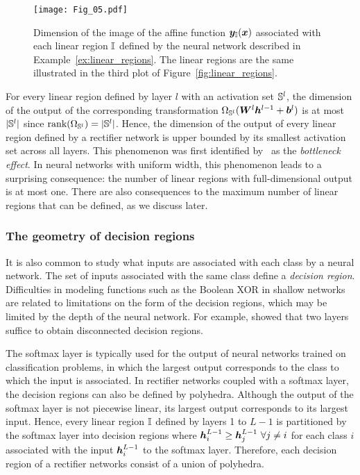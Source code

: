 \begin{figure}
    \centering
    \texttt{[image: Fig\_05.pdf]}
    \caption{Dimension of the image of the affine function ${\bm{y}}_{{\mathbb{I}}}({\bm{x}})$ associated with each linear region ${\mathbb{I}}$ defined by the neural network described in Example~\ref{ex:linear_regions}. The linear regions are the same illustrated in the third plot of Figure~\ref{fig:linear_regions}.}
    \label{fig:dimensions}
\end{figure}


For every linear region defined by layer $l$ with an activation set ${\mathbb{S}}^l$, the dimension of the output of the corresponding transformation $\Omega_{{\mathbb{S}}^l}({\bm{W}}^l {\bm{h}}^{l-1} + {\bm{b}}^l)$ is at most $|{\mathbb{S}}^l|$ since $\text{rank}(\Omega_{{\mathbb{S}}^l}) = |{\mathbb{S}}^l|$. Hence, the dimension of the output of every linear region defined by a rectifier network is upper bounded by its smallest activation set across all layers. This phenomenon was first identified by~\cite{serra2018bounding} as the \emph{bottleneck effect}. In neural networks with uniform width, this phenomenon leads to a surprising consequence: the number of linear regions with full-dimensional output is at most one. There are also consequences to the maximum number of linear regions that can be defined, as we discuss later.
% 


\subsubsection{The geometry of decision regions}

It is also common to study what inputs are associated with each class by a neural network.  
The set of inputs associated with the same class define a \emph{decision region}. 
Difficulties in modeling functions such as the Boolean XOR in shallow networks are related to limitations on the form of the decision regions, 
which may be limited by the depth of the neural network. 
For example, \cite{makhoul1989twolayer} showed that two layers suffice to obtain disconnected decision regions. 

The softmax layer is typically used for the output of neural networks trained on classification problems,  
in which the largest output corresponds to the class to which the input is associated. 
%
In rectifier networks coupled with a softmax layer, 
the decision regions can also be defined by polyhedra. 
Although the output of the softmax layer is not piecewise linear, 
its largest output corresponds to its largest input. 
Hence, every linear region ${\mathbb{I}}$ defined by layers 1 to $L-1$ is partitioned by the softmax layer into decision regions 
where ${\bm{h}}^{L-1}_i \geq {\bm{h}}^{L-1}_j ~ \forall j \neq i$ for each class $i$ associated with the input ${\bm{h}}_i^{L-1}$ to the softmax layer. 
Therefore, 
each decision region of a rectifier networks consist of a union of polyhedra. 

